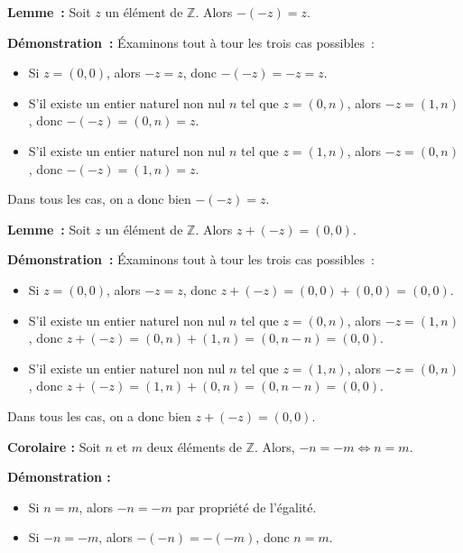 \medskip

\noindent\textbf{Lemme :} Soit $z$ un élément de $\mathbb{Z}$. 
    Alors $-(-z) = z$.

\medskip

\noindent\textbf{Démonstration :} Éxaminons tout à tour les trois cas possibles : 
\begin{itemize}[nosep]
    \item Si $z = (0,0)$, alors $-z = z$, donc $-(-z) = -z = z$.
    \item S'il existe un entier naturel non nul $n$ tel que $z = (0,n)$, alors $-z = (1,n)$, donc $-(-z) = (0,n) = z$.
    \item S'il existe un entier naturel non nul $n$ tel que $z = (1,n)$, alors $-z = (0,n)$, donc $-(-z) = (1,n) = z$.
\end{itemize}
Dans tous les cas, on a donc bien $-(-z) = z$.

\done

\medskip

\noindent\textbf{Lemme :} Soit $z$ un élément de $\mathbb{Z}$. 
    Alors $z + (-z) = (0,0)$.

\medskip

\noindent\textbf{Démonstration :} Éxaminons tout à tour les trois cas possibles : 
\begin{itemize}[nosep]
    \item Si $z = (0,0)$, alors $-z = z$, donc $z + (-z) = (0,0) + (0,0) = (0,0)$.
    \item S'il existe un entier naturel non nul $n$ tel que $z = (0,n)$, alors $-z = (1,n)$, donc $z + (-z) = (0,n) + (1,n) = (0,n-n) = (0,0)$.
    \item S'il existe un entier naturel non nul $n$ tel que $z = (1,n)$, alors $-z = (0,n)$, donc $z + (-z) = (1,n) + (0,n) = (0,n-n) = (0,0)$.
\end{itemize}
Dans tous les cas, on a donc bien $z + (-z) = (0,0)$.

\done

\medskip

\noindent\textbf{Corolaire :} Soit $n$ et $m$ deux éléments de $\mathbb{Z}$. 
    Alors, $-n = -m \Leftrightarrow n = m$.

\medskip

\noindent\textbf{Démonstration :} 
    \begin{itemize}[nosep]
        \item Si $n = m$, alors $-n = -m$ par propriété de l'égalité.
        \item Si $-n = -m$, alors $-(-n) = -(-m)$, donc $n = m$.
    \end{itemize}

